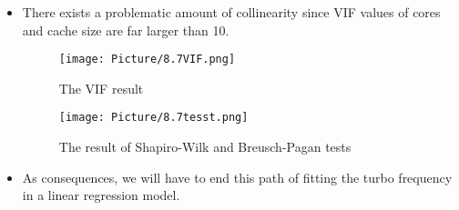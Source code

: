 \documentclass[a4paper]{article}
\begin{document}
\begin{itemize}
     \item[] There exists a problematic amount of collinearity since VIF values of cores and cache size are far larger than 10.
    
    \begin{figure}[H]
        \centering
        \texttt{[image: Picture/8.7VIF.png]}
        \caption{The VIF result}
        \label{8.3.4}
    \end{figure}
    
    \begin{figure}[H]
        \centering
        \texttt{[image: Picture/8.7tesst.png]}
        \caption{The result of Shapiro-Wilk and Breusch-Pagan tests}
        \label{8.3.4}
    \end{figure}
    
   \item[] As consequences, we will have to end this path of fitting the turbo frequency in a linear regression model.
\end{itemize}
\end{document}
